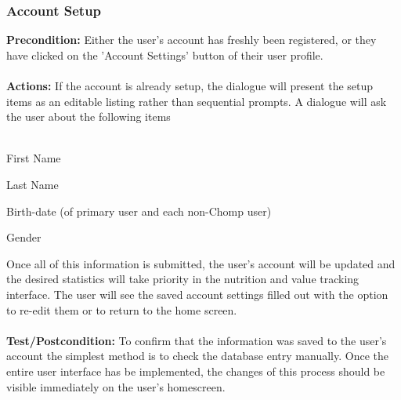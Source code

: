 \documentclass[a4paper,12pt]{article}
\begin{document}
\subsubsection{Account Setup}
\textbf{Precondition:} Either the user's account has freshly been registered, or they have clicked on the 'Account Settings' button of their user profile.\\
\\
\textbf{Actions:} If the account is already setup, the dialogue will present the setup items as an editable listing rather than sequential prompts.  A dialogue will ask the user about the following items\\
\\
\begin{list}{•}{•}
\item First Name
\item Last Name
\item Birth-date (of primary user and each non-Chomp user)
\item Gender
\end{list}
Once all of this information is submitted, the user's account will be updated and the desired statistics will take priority in the nutrition and value tracking interface.  The user will see the saved account settings filled out with the option to re-edit them or to return to the home screen.\\
\\
\textbf{Test/Postcondition:} To confirm that the information was saved to the user's account the simplest method is to check the database entry manually.  Once the entire user interface has be implemented, the changes of this process should be visible immediately on the user's homescreen.
\end{document}
